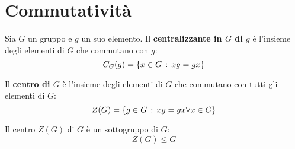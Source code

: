 \chapter{Commutatività}

Sia $G$ un gruppo e $g$ un suo elemento.
Il \textbf{centralizzante in $G$ di $g$} è l'insieme degli elementi di $G$ che commutano con $g$:
\begin{equation*}
    C_G(g) = \{x \in G \,:\, xg = gx\}
\end{equation*}

Il \textbf{centro di $G$} è l'insieme degli elementi di $G$ che commutano con tutti gli elementi di $G$:
\begin{equation*}
    Z(G) = \{g \in G \,:\, xg = gx \forall x \in G\}
\end{equation*}

Il centro $Z(G)$ di $G$ è un sottogruppo di $G$:
\begin{equation*}
    Z(G) \le G
\end{equation*}